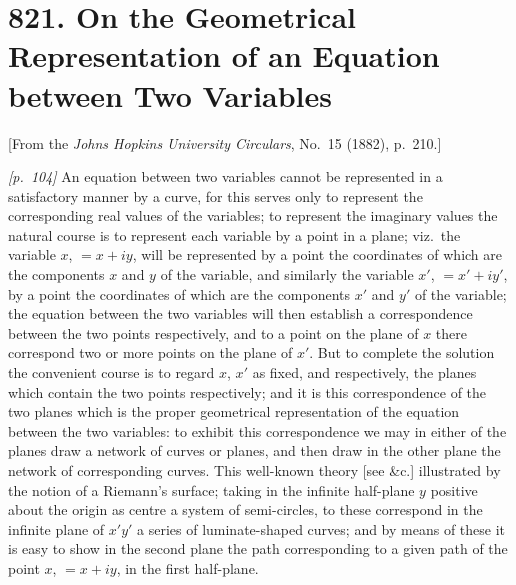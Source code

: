 \documentclass[11pt,a4paper]{book}
\begin{document}
\section*{821. On the Geometrical Representation of an Equation between Two Variables}

\begin{center}
\small[From the \textit{Johns Hopkins University Circulars}, No.~15 (1882), p.~210.]
\end{center}

\bigskip

\noindent\textit{[p.~104]} An equation between two variables cannot be represented in a satisfactory manner by a curve, for this serves only to represent the corresponding real values of the variables; to represent the imaginary values the natural course is to represent each variable by a point in a plane; viz.\ the variable $x$, $= x + iy$, will be represented by a point the coordinates of which are the components $x$ and $y$ of the variable, and similarly the variable $x'$, $= x' + iy'$, by a point the coordinates of which are the components $x'$ and $y'$ of the variable; the equation between the two variables will then establish a correspondence between the two points respectively, and to a point on the plane of $x$ there correspond two or more points on the plane of $x'$. But to complete the solution the convenient course is to regard $x$, $x'$ as fixed, and respectively, the planes which contain the two points respectively; and it is this correspondence of the two planes which is the proper geometrical representation of the equation between the two variables: to exhibit this correspondence we may in either of the planes draw a network of curves or planes, and then draw in the other plane the network of corresponding curves. This well-known theory [see {\&}c.] illustrated by the notion of a Riemann's surface; taking in the infinite half-plane $y$ positive about the origin as centre a system of semi-circles, to these correspond in the infinite plane of $x'y'$ a series of luminate-shaped curves; and by means of these it is easy to show in the second plane the path corresponding to a given path of the point $x$, $= x + iy$, in the first half-plane.

\bigskip

\end{document}
